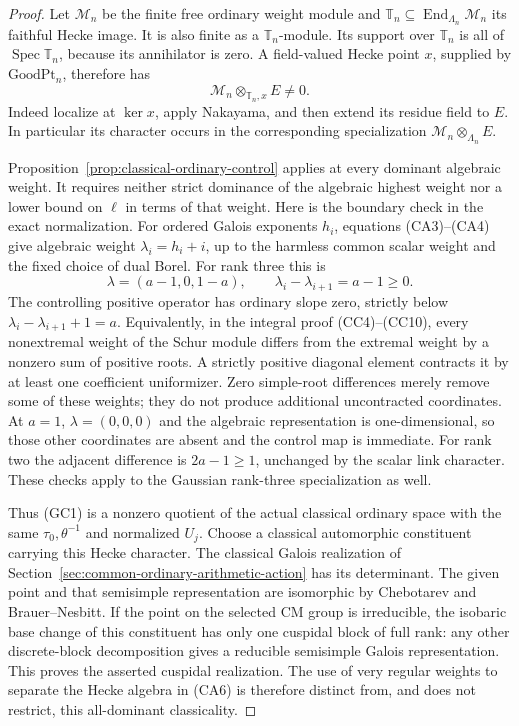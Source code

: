 \begin{proof}
Let \(\mathcal M_n\) be the finite free ordinary weight module
and \(\mathbb T_n\subseteq\operatorname{End}_{\Lambda_n}\mathcal M_n\)
its faithful Hecke image.
It is also finite as a \(\mathbb T_n\)-module.
Its support over \(\mathbb T_n\) is all of
\(\operatorname{Spec}\mathbb T_n\), because its
annihilator is zero.
A field-valued Hecke point \(x\), supplied by
\(\mathrm{GoodPt}_n\), therefore has
\[
                       \mathcal M_n\otimes_{\mathbb T_n,x}E\ne0 .
 \tag{GC1}
\]
Indeed localize at \(\ker x\), apply Nakayama, and
then extend its residue field to \(E\).
In particular its character occurs in the corresponding
specialization \(\mathcal M_n\otimes_{\Lambda_n}E\).

Proposition~\ref{prop:classical-ordinary-control}
applies at every dominant algebraic weight.
It requires neither strict dominance of the algebraic
highest weight nor a lower bound on \(\ell\) in terms
of that weight.
Here is the boundary check in the exact normalization.
For ordered Galois exponents \(h_i\), equations
(CA3)--(CA4) give algebraic weight
\(\lambda_i=h_i+i\), up to the harmless common
scalar weight and the fixed choice of dual Borel.
For rank three this is
\[
           \lambda=(a-1,0,1-a),\qquad
           \lambda_i-\lambda_{i+1}=a-1\ge0 .
 \tag{GC2}
\]
The controlling positive operator has ordinary slope
zero, strictly below
\(\lambda_i-\lambda_{i+1}+1=a\).
Equivalently, in the integral proof (CC4)--(CC10),
every nonextremal weight of the Schur module differs
from the extremal weight by a nonzero sum of positive
roots. A strictly positive diagonal element contracts
it by at least one coefficient uniformizer.
Zero simple-root differences merely remove some
of these weights; they do not produce additional
uncontracted coordinates.
At \(a=1\), \(\lambda=(0,0,0)\) and the algebraic
representation is one-dimensional, so those
other coordinates are absent and the control
map is immediate.
For rank two the adjacent difference is
\(2a-1\ge1\), unchanged by the scalar link character.
These checks apply to the Gaussian rank-three
specialization as well.

Thus (GC1) is a nonzero quotient of the actual
classical ordinary space with the same
\(\tau_0,\theta^{-1}\) and normalized \(U_j\).
Choose a classical automorphic constituent carrying
this Hecke character.
The classical Galois realization of
Section~\ref{sec:common-ordinary-arithmetic-action}
has its determinant.
The given point and that semisimple representation
are isomorphic by Chebotarev and Brauer--Nesbitt.
If the point on the selected CM group is irreducible,
the isobaric base change of this constituent has
only one cuspidal block of full rank:
any other discrete-block decomposition gives a
reducible semisimple Galois representation.
This proves the asserted cuspidal realization.
The use of very regular weights to separate the
Hecke algebra in (CA6) is therefore distinct from,
and does not restrict, this all-dominant classicality.
\end{proof}

